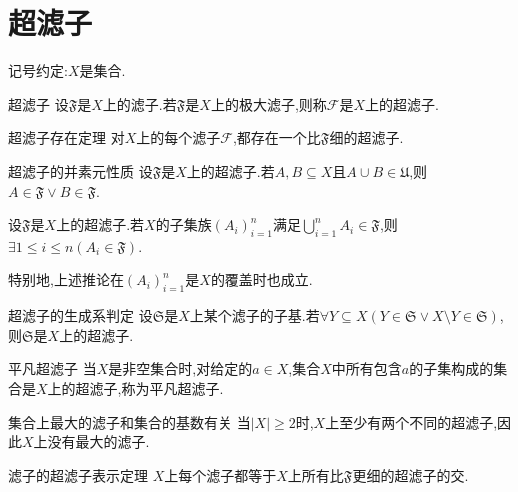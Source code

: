 \section{超滤子}

记号约定:$X$是集合.

\begin{definition}{超滤子}{}
	设$\mathfrak{F}$是$X$上的滤子.若$\mathfrak{F}$是$X$上的极大滤子,则称$\mathcal{F}$是$X$上的超滤子.
\end{definition}

\begin{theorem}{超滤子存在定理}{}
	对$X$上的每个滤子$\mathcal{F}$,都存在一个比$\mathfrak{F}$细的超滤子.
\end{theorem}

\begin{proposition}{超滤子的并素元性质}{}
	设$\mathfrak{F}$是$X$上的超滤子.若$A,B\subseteq X$且$A\cup B\in\mathfrak{U}$,则$A\in\mathfrak{F}\vee B\in\mathfrak{F}$.
\end{proposition}

\begin{corollary}{}{}
	设$\mathfrak{F}$是$X$上的超滤子.若$X$的子集族$\left(A_{i}\right)_{i=1}^{n}$满足$\bigcup\limits_{i=1}^{n}A_{i}\in\mathfrak{F}$,则$\exists 1\leq i\leq n\left(A_{i}\in\mathfrak{F}\right)$.
\end{corollary}

\begin{remark}{}{}
	特别地,上述推论在$\left(A_{i}\right)_{i=1}^{n}$是$X$的覆盖时也成立.
\end{remark}

\begin{proposition}{超滤子的生成系判定}{}
	设$\mathfrak{S}$是$X$上某个滤子的子基.若$\forall Y\subseteq X\left(Y\in\mathfrak{S}\vee X\setminus Y\in\mathfrak{S}\right)$,则$\mathfrak{S}$是$X$上的超滤子.
\end{proposition}

\begin{example}{平凡超滤子}{}
	当$X$是非空集合时,对给定的$a\in X$,集合$X$中所有包含$a$的子集构成的集合是$X$上的超滤子,称为平凡超滤子.
\end{example}

\begin{remark}{集合上最大的滤子和集合的基数有关}{}
	当$\left|X\right|\geqslant 2$时,$X$上至少有两个不同的超滤子,因此$X$上没有最大的滤子.
\end{remark}

\begin{proposition}{滤子的超滤子表示定理}{}
	$X$上每个滤子都等于$X$上所有比$\mathfrak{F}$更细的超滤子的交.
\end{proposition}



